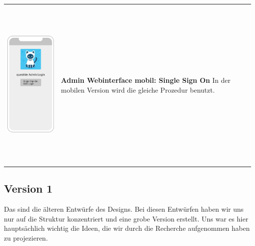 \begin{tabular}{C{6cm}  L{7cm}}
    \includegraphics[width=5cm,height=8.5cm]{bilder/new vers. UI Design/Login SSO/Interface SSO v1.2.png} & \textbf{Admin Webinterface mobil: Single Sign On} \newline 
    In der mobilen Version wird die gleiche Prozedur benutzt.
\end{tabular}

\newpage

\subsection{Version 1}

Das sind die älteren Entwürfe des Designs. Bei diesen Entwürfen haben wir uns nur auf die Struktur
konzentriert und eine grobe Version erstellt. Uns war es hier hauptsächlich wichtig 
die Ideen, die wir durch die Recherche aufgenommen haben zu projezieren.
\\

